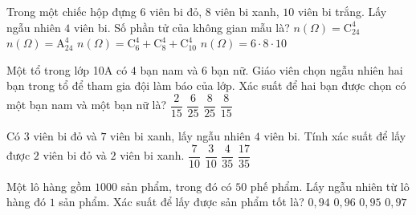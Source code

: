 \begin{ex}%
	Trong một chiếc hộp đựng $6$ viên bi đỏ, $8$ viên bi xanh, $10$ viên bi trắng. Lấy ngẫu nhiên $4$ viên bi.
	Số phần tử của không gian mẫu là?
	\choice
	{\True $n(\Omega)=\mathrm{C}_{24}^4$}
	{$n(\Omega)=\mathrm{A}_{24}^4$}
	{$n(\Omega)=\mathrm{C}_6^4+\mathrm{C}_8^4+\mathrm{C}_{10}^4$}
	{$n(\Omega)=6\cdot 8\cdot 10$}
\end{ex}
\begin{ex}%
	Một tổ trong lớp 10A có $4$ bạn nam và $6$ bạn nữ. Giáo viên chọn ngẫu nhiên hai bạn trong tổ để tham gia đội làm báo của lớp. Xác suất để hai bạn được chọn có một bạn nam và một bạn nữ là?
	\choice
	{$\dfrac{2}{15}$}
	{$\dfrac{6}{25}$}
	{$\dfrac{8}{25}$}
	{\True $\dfrac{8}{15}$}
\end{ex}
\begin{ex}%
	Có $3$ viên bi đỏ và $7$ viên bi xanh, lấy ngẫu nhiên $4$ viên bi. Tính xác suất để lấy được $2$ viên bi đỏ và $2$ viên bi xanh.
	\choice
	{$\dfrac{7}{10}$}
	{\True $\dfrac{3}{10}$}
	{$\dfrac{4}{35}$}
	{$\dfrac{17}{35}$}
\end{ex}
\begin{ex}%
	Một lô hàng gồm $1000$ sản phẩm, trong đó có $50$ phế phẩm. Lấy ngẫu nhiên từ lô hàng đó $1$ sản
	phẩm. Xác suất để lấy được sản phẩm tốt là?
	\choice
	{$0{,}94$}
	{$0{,}96$}
	{\True $0{,}95$}
	{$0{,}97$}
\end{ex}
